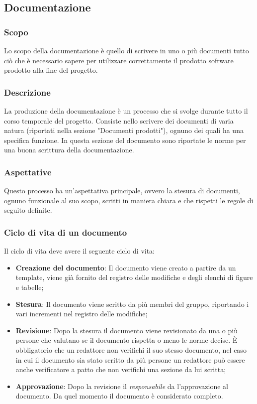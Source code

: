 \documentclass[../norme_di_progetto.tex]{subfiles}
\begin{document}
\subsection{Documentazione}

\subsubsection{Scopo}
Lo scopo della documentazione è quello di scrivere in uno o più documenti tutto ciò che è necessario sapere per utilizzare correttamente il prodotto software prodotto alla fine del progetto.

\subsubsection{Descrizione}
La produzione della documentazione è un processo che si svolge durante tutto il corso temporale del progetto. Consiste nello scrivere dei documenti di varia natura (riportati nella sezione "Documenti prodotti"), ognuno dei quali ha una specifica funzione. In questa sezione del documento sono riportate le norme per una buona scrittura della documentazione.

\subsubsection{Aspettative}
Questo processo ha un'aspettativa principale,  ovvero la stesura di documenti, ognuno funzionale al suo scopo, scritti in maniera chiara e che rispetti le regole di seguito definite.

\subsubsection{Ciclo di vita di un documento}
Il ciclo di vita deve avere il seguente ciclo di vita:
\begin{itemize}
    \item \textbf{Creazione del documento}: Il documento viene creato a partire da un template, viene già fornito del registro delle modifiche e degli elenchi di figure e tabelle;
    \item \textbf{Stesura}: Il documento viene scritto da più membri del gruppo, riportando i vari incrementi nel registro delle modifiche;
    \item \textbf{Revisione}: Dopo la stesura il documento viene revisionato da una o più persone che valutano se il documento rispetta o meno le norme decise. È obbligatorio che un redattore non verifichi il suo stesso documento, nel caso in cui il documento sia stato scritto da più persone un redattore può essere anche verificatore a patto che non verifichi una sezione da lui scritta;
    \item \textbf{Approvazione}: Dopo la revisione il \emph{responsabile} da l'approvazione al documento. Da quel momento il documento è considerato completo.
\end{itemize}
\end{document}
